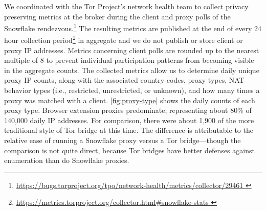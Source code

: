 \documentclass[letterpaper,twocolumn]{article}
\newlength{\urlfootnotesize}
\newcommand{\urlfootnote}[1]{\footnote{
\raggedright\fontsize{\urlfootnotesize}{\urlfootnotesize}\selectfont\url{#1}
}}
\begin{document}
We coordinated with the Tor Project's network health team to collect privacy preserving metrics at the broker
during the client and proxy polls of the Snowflake rendezvous.\urlfootnote{
https://bugs.torproject.org/tpo/network-health/metrics/collector/29461
}
The resulting metrics
are published at the end of every 24 hour collection period\urlfootnote{
https://metrics.torproject.org/collector.html\#snowflake-stats
}
in aggregate and we do not publish or store
client or proxy IP addresses. Metrics concerning client polls are rounded up to the nearest multiple
of 8 to prevent individual participation patterns from becoming visible in the aggregate counts.
The collected metrics allow us to determine daily unique proxy IP counts,
along with the associated country
codes, proxy types, NAT behavior types (i.e., restricted, unrestricted, or unknown), and how many times
a proxy was matched with a client.
\autoref{fig:proxy-type} shows the daily counts
of each proxy type.
Browser extension proxies predominate,
representing about 80\%
of 140,000 daily IP addresses.
For comparison, there were about 1,900
of the more traditional style of Tor bridge at this time.
The difference is attributable to the relative ease
of running a Snowflake proxy versus a Tor bridge---though
the comparison is not quite direct,
because Tor bridges have better defenses
against enumeration than do Snowflake proxies.
\end{document}

